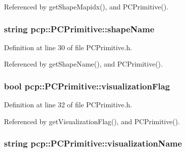 Referenced by get\-Shape\-Mapidx(), and P\-C\-Primitive().

\hypertarget{classpcp_1_1PCPrimitive_a120d0dd6120b9fe1af74d698d40adb1c}{
\subsubsection[{shape\-Name}]{\setlength{\rightskip}{0pt plus 5cm}string pcp\-::\-P\-C\-Primitive\-::shape\-Name\hspace{0.3cm}{\ttfamily [private]}}}\label{classpcp_1_1PCPrimitive_a120d0dd6120b9fe1af74d698d40adb1c}


Definition at line 30 of file P\-C\-Primitive.\-h.



Referenced by get\-Shape\-Name(), and P\-C\-Primitive().

\hypertarget{classpcp_1_1PCPrimitive_a44cc3f58388966da71e1b07b52d3081c}{
\subsubsection[{visualization\-Flag}]{\setlength{\rightskip}{0pt plus 5cm}bool pcp\-::\-P\-C\-Primitive\-::visualization\-Flag\hspace{0.3cm}{\ttfamily [private]}}}\label{classpcp_1_1PCPrimitive_a44cc3f58388966da71e1b07b52d3081c}


Definition at line 32 of file P\-C\-Primitive.\-h.



Referenced by get\-Visualization\-Flag(), and P\-C\-Primitive().

\hypertarget{classpcp_1_1PCPrimitive_a8ac9332a85fb342e957959c97012f4d3}{
\subsubsection[{visualization\-Name}]{\setlength{\rightskip}{0pt plus 5cm}string pcp\-::\-P\-C\-Primitive\-::visualization\-Name\hspace{0.3cm}{\ttfamily [private]}}}\label{classpcp_1_1PCPrimitive_a8ac9332a85fb342e957959c97012f4d3}


